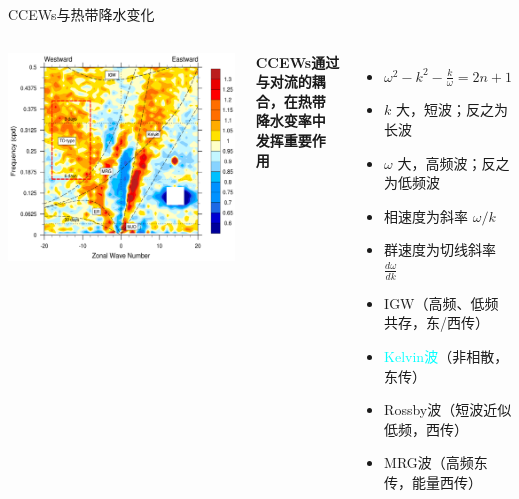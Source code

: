 \documentclass[10pt]{beamer}
\begin{document}
\begin{frame}{CCEWs与热带降水变化}
    \begin{columns}[c]
        \includegraphics[width=\linewidth]{fig/spectrum.png}

        \small
        \textbf{CCEWs通过与对流的耦合，在热带降水变率中发挥重要作用}
        \vspace{0.3cm}

        \begin{itemize}
            \item $\omega^2 - k^2 - \frac{k}{\omega} = 2n + 1$
            \item $k$ 大，短波；反之为长波
            \item $\omega$ 大，高频波；反之为低频波
            \item 相速度为斜率 $\omega/k$
            \item 群速度为切线斜率 $\frac{d\omega}{dk}$
            \item IGW（高频、低频共存，东/西传）
            \item \textcolor{cyan}{Kelvin波}（非相散，东传）
            \item Rossby波（短波近似低频，西传）
            \item MRG波（高频东传，能量西传）
        \end{itemize}
    \end{columns}
\end{frame}
\end{document}
